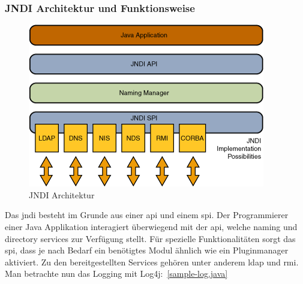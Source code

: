 \subsubsection{JNDI Architektur und Funktionsweise}
\newline
\begin{figure}[!htb] %
    \begin{center}
        \includegraphics[scale=0.75]{images/jndiarch}
    \end{center}
    \caption{JNDI Architektur}
\end{figure}
\newline\newline
Das \gls{jndi} besteht im Grunde aus einer \gls{api} und einem \gls{spi}. Der Programmierer einer Java Applikation interagiert überwiegend mit der \gls{api}, welche
naming und directory services zur Verfügung stellt. Für spezielle Funktionalitäten sorgt das \gls{spi}, dass je nach Bedarf ein benötigtes Modul ähnlich wie ein Pluginmanager
aktiviert. Zu den bereitgestellten Services gehören unter anderem \gls{ldap} und \gls{rmi}.\clearpage
Man betrachte nun das Logging mit Log4j:~\ref{sample-log.java}

